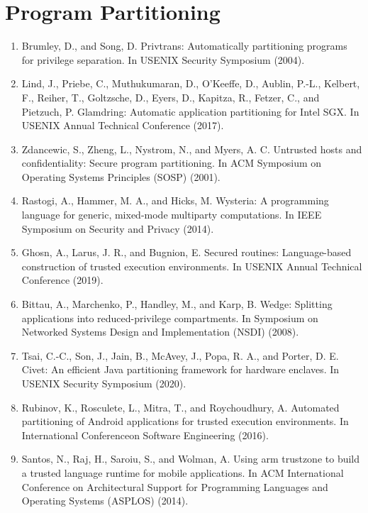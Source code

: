 \section{Program Partitioning} 

\begin{enumerate}[resume]
\item  Brumley, D., and Song, D. Privtrans: Automatically partitioning programs for privilege separation. In USENIX Security Symposium (2004).
\item  Lind, J., Priebe, C., Muthukumaran, D., O’Keeffe, D., Aublin, P.-L., Kelbert, F., Reiher, T., Goltzsche, D., Eyers, D., Kapitza, R., Fetzer, C., and Pietzuch, P. Glamdring: Automatic application partitioning for Intel SGX. In USENIX Annual Technical Conference (2017).
\item  Zdancewic, S., Zheng, L., Nystrom, N., and Myers, A. C. Untrusted hosts and confidentiality: Secure program partitioning. In ACM Symposium on Operating Systems Principles (SOSP) (2001).
\item  Rastogi, A., Hammer, M. A., and Hicks, M. Wysteria: A programming language for generic, mixed-mode multiparty computations. In IEEE Symposium on Security and Privacy (2014).
\item Ghosn, A., Larus, J. R., and Bugnion, E. Secured routines: Language-based construction of trusted execution environments. In USENIX Annual Technical Conference (2019).
\item Bittau, A., Marchenko, P., Handley, M., and Karp, B. Wedge: Splitting applications into reduced-privilege compartments. In Symposium on Networked Systems Design and Implementation (NSDI) (2008).
\item Tsai, C.-C., Son, J., Jain, B., McAvey, J., Popa, R. A., and Porter, D. E. Civet: An efficient Java partitioning framework for hardware enclaves. In USENIX Security Symposium (2020).
\item Rubinov, K., Rosculete, L., Mitra, T., and Roychoudhury, A. Automated partitioning of Android applications for trusted execution environments. In International Conferenceon Software Engineering (2016).
\item Santos, N., Raj, H., Saroiu, S., and Wolman, A. Using arm trustzone to build a trusted language runtime for mobile applications. In ACM International Conference on Architectural Support for Programming Languages and Operating Systems (ASPLOS) (2014).
\end{enumerate}

